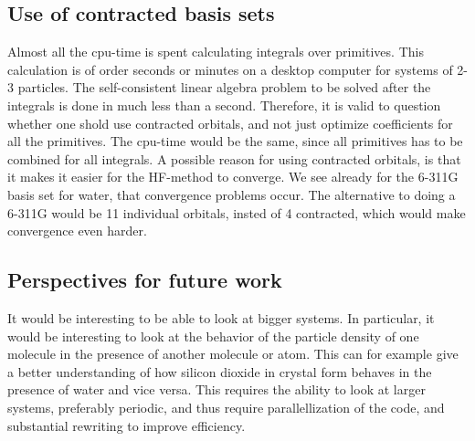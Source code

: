 \documentclass[a4paper,10pt, twocolumn, pre]{revtex4}
\begin{document}
\subsection{Use of contracted basis sets}
Almost all the cpu-time is spent calculating integrals over primitives. This calculation is of order seconds or minutes on a desktop computer for systems of 2-3 particles. The self-consistent linear algebra problem to be solved after the integrals is done in much less than a second. Therefore, it is valid to question whether one shold use contracted orbitals, and not just optimize coefficients for all the primitives. The cpu-time would be the same, since all primitives has to be combined for all integrals. A possible reason for using contracted orbitals, is that it makes it easier for the HF-method to converge. We see already for the 6-311G basis set for water, that convergence problems occur. The alternative to doing a 6-311G would be 11 individual orbitals, insted of 4 contracted, which would make convergence even harder. 


\subsection{Perspectives for future work}
It would be interesting to be able to look at bigger systems. In particular, it would be interesting to look at the behavior of the particle density of one molecule in the presence of another molecule or atom. This can for example give a better understanding of how silicon dioxide in crystal form behaves in the presence of water and vice versa. This requires the ability to look at larger systems, preferably periodic, and thus require parallellization of the code, and substantial rewriting to improve efficiency. 
\end{document}
